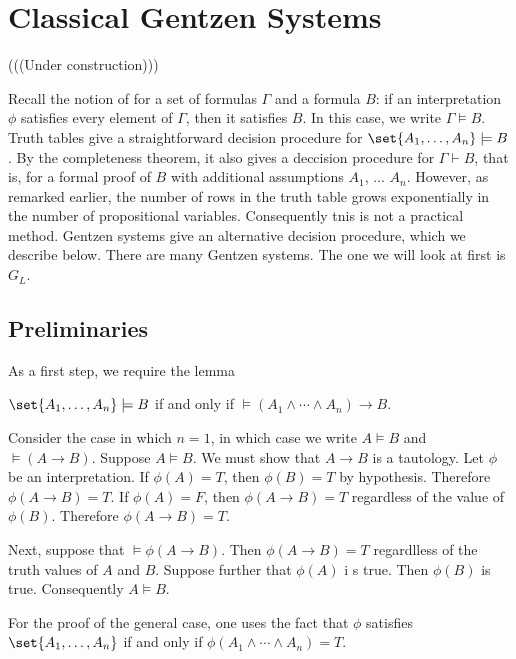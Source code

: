
\section{Classical Gentzen Systems}

(((Under construction)))

\innertableofcontents

Recall the notion of  for a set of formulas $\Gamma$ and a formula $B$: if an interpretation $\phi$ satisfies every element of $\Gamma$, then it satisfies $B$.  In this case, we write $\Gamma \models B$.  Truth tables give a straightforward decision procedure for $\set{A_1, \ldots, A_n} \models B$. By the completeness theorem, it also gives a deccision procedure for $\Gamma \vdash B$, that is, for a formal proof of $B$ with additional assumptions $A_1$, ... $A_n$. However, as remarked earlier, the number of rows in the truth table grows exponentially in the number of propositional variables.  Consequently tnis is not a practical method.  Gentzen systems give an alternative decision procedure, which we describe below.  There are many Gentzen systems.  The one we will look at first is $G_L$.




\subsection{Preliminaries}

As a first step, we require the lemma

\begin{lemma}
$\set{A_1, \ldots, A_n} \models B$ if and only if $\models (A_1 \land \cdots \land A_n) \to B$.
\end{lemma}

Consider the case in which $n= 1$, in which case we write $A \models B$ and 
$\models (A \to B)$.  Suppose $A \models B$. We must show that $A \to B$
 is a tautology.  Let $\phi$ be an interpretation.  If $\phi(A) = T$, then 
$\phi(B) = T$ by hypothesis.  Therefore $\phi(A \to B) = T$.  If $\phi(A) = F$, then $\phi(A \to B) = T$ regardless of the value of $\phi(B)$.  Therefore $\phi(A \to B) = T$.

Next, suppose that $\models \phi(A \to B)$.  Then $\phi(A \to B) = T$ regardlless of the truth values of $A$ and $B$.  Suppose further that $\phi(A)$ i s true. Then $\phi(B)$ is true.  Consequently $A \models B$.

For the proof of the general case, one uses the fact that $\phi$ satisfies $\set{A_1, \ldots, A_n}$ if and only if $\phi(A_1 \land \cdots \land A_n) = T$. 

